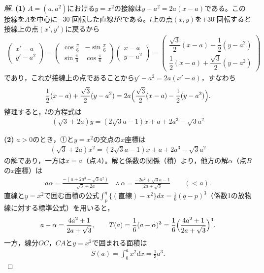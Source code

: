 \documentclass[../main.tex]{subfiles}
\begin{document}
\begin{proof}[解]
  \textbf{(1)} $A=(a,a^2)$における$y=x^2$の接線は$y-a^2=2a(x-a)$である。この接線を$A$を中心に$-30^\circ$回転した直線が$l$である。$l$上の点$(x,y)$を$+30^\circ$回転すると接線上の点$(x',y')$に戻るから
  \begin{align*}
    \begin{pmatrix}x'-a\\y'-a^2
    \end{pmatrix}=
    \begin{pmatrix}\cos\frac\pi6&-\sin\frac\pi6\\\sin\frac\pi6&\cos\frac\pi6
    \end{pmatrix}
    \begin{pmatrix}x-a\\y-a^2
    \end{pmatrix}
    =
    \begin{pmatrix}\dfrac{\sqrt3}2(x-a)-\dfrac12(y-a^2)\\[4pt]\dfrac12(x-a)+\dfrac{\sqrt3}2(y-a^2)
    \end{pmatrix}
  \end{align*}
  であり，これが接線上の点であることから$y'-a^2=2a(x'-a)$，すなわち
  \begin{align*}
    \frac12(x-a)+\frac{\sqrt3}2(y-a^2)=2a\Bigl(\frac{\sqrt3}2(x-a)-\frac12(y-a^2)\Bigr).
  \end{align*}
  整理すると，$l$の方程式は
  \begin{align*}
    (\sqrt3+2a)y=(2\sqrt3a-1)x+a+2a^3-\sqrt3a^2\tag{①}
  \end{align*}

  \textbf{(2)} $a>0$のとき，①と$y=x^2$の交点の$x$座標は
  \begin{align*}
    (\sqrt3+2a)x^2=(2\sqrt3a-1)x+a+2a^3-\sqrt3a^2
  \end{align*}
  の解であり，一方は$x=a$（点$A$）。解と係数の関係（積）より，他方の解$\alpha$（点$B$の$x$座標）は
  \begin{align*}
    a\alpha=\frac{-(a+2a^3-\sqrt3a^2)}{\sqrt3+2a}\quad\therefore\ \alpha=\frac{-2a^2+\sqrt3a-1}{2a+\sqrt3}\qquad(<a).
  \end{align*}
  直線と$y=x^2$で囲む面積の公式$\int_p^q\{(\text{直線})-x^2\}dx=\frac16(q-p)^3$（係数1の放物線に対する標準公式）を用いると，
  \begin{align*}
    a-\alpha=\frac{4a^2+1}{2a+\sqrt3},\qquad T(a)=\frac16(a-\alpha)^3=\frac16\Bigl(\frac{4a^2+1}{2a+\sqrt3}\Bigr)^3.
  \end{align*}
  一方，線分$OC$，$CA$と$y=x^2$で囲まれる面積は
  \begin{align*}
    S(a)=\int_0^ax^2dx=\frac13a^3.
  \end{align*}


\end{proof}
\end{document}
